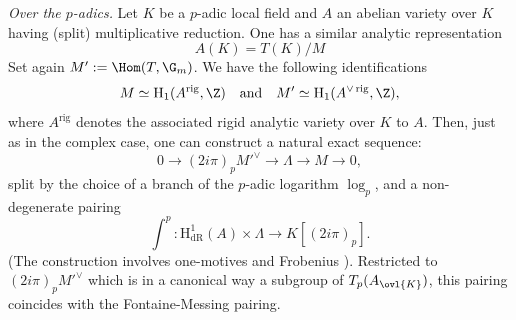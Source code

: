 \begin{para}\label{para-degenerate}
 {\itshape Over the $p$-adics.}
 Let $K$ be a $p$-adic local field
 and $A$ an abelian variety over $K$ having (split) multiplicative
 reduction.  One has a similar analytic representation \cite{aacodavocr}
 \begin{equation*}
  A(K)=T(K)/M
 \end{equation*}
 Set again $M' :=\Hom(T,\G_m)$.  We have the following identifications
 \begin{equation*}
  M\simeq \mathrm{H}_1(A^{\mathrm{rig}},\Z)\quad\mathrm{and}\quad
   M'\simeq \mathrm{H}_1(A^{\vee\,\mathrm{rig}},\Z),
 \end{equation*}
 where $A^{\mathrm{rig}}$ denotes the associated rigid analytic variety
 over $K$ to $A$.  Then, just as in the complex case, one can 
 construct a natural exact sequence:
 \begin{equation*}
  0\longrightarrow (2i\pi)_p{M'}^{\vee}\longrightarrow\Lambda
   \longrightarrow M\longrightarrow 0,
 \end{equation*}
 split by the choice of a branch of the $p$-adic logarithm $\log_p$, 
 and a non-degenerate pairing
 \begin{equation*}
 \int^p\colon\mathrm{H}^1_{\mathrm{dR}}(A)\times\Lambda\longrightarrow
 K[(2i\pi)_p].
 \end{equation*}
 (The construction involves one-motives and Frobenius \cite{pbl}).
 Restricted to $(2i\pi)_p{M'}^{\vee}$ which is in a 
 canonical way a subgroup of $T_p(A_{\ovl{K}})$, this pairing coincides
 with the Fontaine-Messing pairing.
\end{para}

